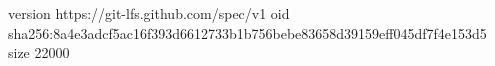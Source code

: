 version https://git-lfs.github.com/spec/v1
oid sha256:8a4e3adcf5ac16f393d6612733b1b756bebe83658d39159eff045df7f4e153d5
size 22000
